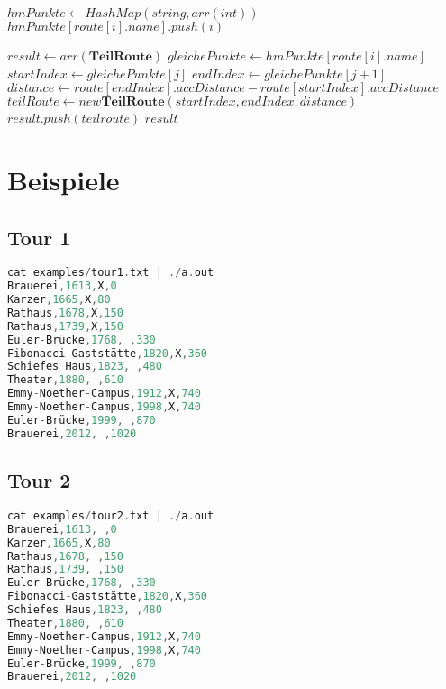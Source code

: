 \documentclass[a4paper,10pt,ngerman]{scrartcl}
\begin{document}
\begin{algorithm}
    \begin{algorithmic}
        \State $hmPunkte \gets HashMap(string, arr(int))$
        \State $hmPunkte[route[i].name].push(i)$
        \EndFor

        \State $result \gets arr(\textbf{TeilRoute})$
        \State $gleichePunkte \gets hmPunkte[route[i].name]$
            \State $startIndex \gets gleichePunkte[j]$
            \State $endIndex \gets gleichePunkte[j + 1]$
                \State $distance \gets route[endIndex].accDistance - route[startIndex].accDistance$
                \State $teilRoute \gets new \textbf{TeilRoute}(startIndex, endIndex, distance)$
                    \State $result.push(teilroute)$
                \EndIf
            \EndIf
        \EndIf
        \EndFor
        \State \Return $result$
        \EndFunction
    \end{algorithmic}
\end{algorithm}

\vspace{0.5cm}

\newpage
\section{Beispiele}

\subsection*{Tour 1}
\begin{lstlisting}[language=C++]
cat examples/tour1.txt | ./a.out
Brauerei,1613,X,0
Karzer,1665,X,80
Rathaus,1678,X,150
Rathaus,1739,X,150
Euler-Brücke,1768, ,330
Fibonacci-Gaststätte,1820,X,360
Schiefes Haus,1823, ,480
Theater,1880, ,610
Emmy-Noether-Campus,1912,X,740
Emmy-Noether-Campus,1998,X,740
Euler-Brücke,1999, ,870
Brauerei,2012, ,1020
\end{lstlisting}

\subsection*{Tour 2}
\begin{lstlisting}[language=C++]
cat examples/tour2.txt | ./a.out
Brauerei,1613, ,0
Karzer,1665,X,80
Rathaus,1678, ,150
Rathaus,1739, ,150
Euler-Brücke,1768, ,330
Fibonacci-Gaststätte,1820,X,360
Schiefes Haus,1823, ,480
Theater,1880, ,610
Emmy-Noether-Campus,1912,X,740
Emmy-Noether-Campus,1998,X,740
Euler-Brücke,1999, ,870
Brauerei,2012, ,1020
\end{lstlisting}
\end{document}
